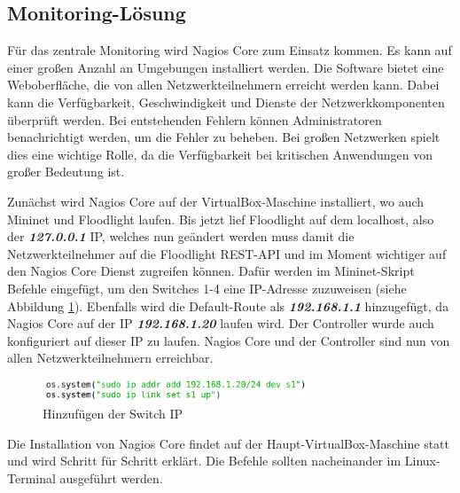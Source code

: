 \documentclass[fontsize=12pt,paper=a4,open=any,parskip=half,
  twoside=false,toc=listof,toc=bibliography,fleqn,leqno,
  captions=nooneline,captions=tableabove,british]{scrbook}
\begin{document}
\subsection{Monitoring-Lösung}
Für das zentrale Monitoring wird Nagios Core zum Einsatz kommen. Es kann auf einer großen Anzahl an Umgebungen installiert werden. Die Software bietet eine Weboberfläche, die von allen Netzwerkteilnehmern erreicht werden kann. Dabei kann die Verfügbarkeit, Geschwindigkeit und Dienste der Netzwerkkomponenten überprüft werden. Bei entstehenden Fehlern können Administratoren benachrichtigt werden, um die Fehler zu beheben. Bei großen Netzwerken spielt dies eine wichtige Rolle, da die Verfügbarkeit bei kritischen Anwendungen von großer Bedeutung ist.\par
Zunächst wird Nagios Core auf der VirtualBox-Maschine installiert, wo auch Mininet und Floodlight laufen. Bis jetzt lief Floodlight auf dem localhost, also der \textit{\textbf{127.0.0.1}} IP, welches nun geändert werden muss damit die Netzwerkteilnehmer auf die Floodlight REST-API und im Moment wichtiger auf den Nagios Core Dienst zugreifen können. Dafür werden im Mininet-Skript Befehle eingefügt, um den Switches 1-4 eine IP-Adresse zuzuweisen (siehe Abbildung \ref{switch}). Ebenfalls wird die Default-Route als \textit{\textbf{192.168.1.1}} hinzugefügt, da Nagios Core auf der IP \textit{\textbf{192.168.1.20}} laufen wird. Der Controller wurde auch konfiguriert auf dieser IP zu laufen. Nagios Core und der Controller sind nun von allen Netzwerkteilnehmern erreichbar.

\begin{figure}[H]
 \centering
 \includegraphics[width=0.7\textwidth]{Bilder/switch}
 \captionsetup{justification=centering, margin=2cm}
 \caption{Hinzufügen der Switch IP}
 \label{switch}
\end{figure}
 
Die Installation von Nagios Core findet auf der Haupt-VirtualBox-Maschine statt und wird Schritt für Schritt erklärt. Die Befehle sollten nacheinander im Linux-Terminal ausgeführt werden.
\end{document}
